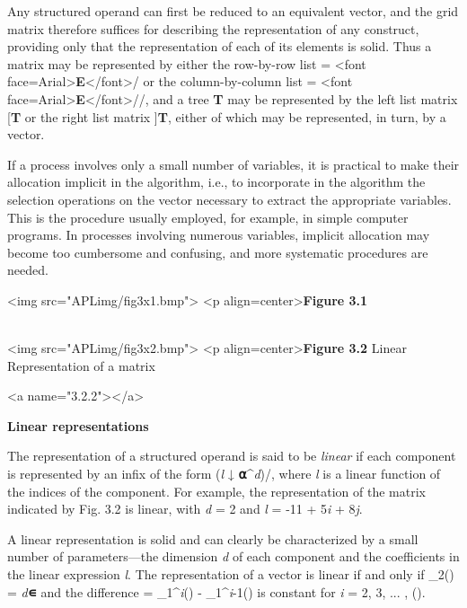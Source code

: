 {\par Any structured operand can first be reduced to an equivalent vector, and the grid matrix therefore suffices for describing the representation of any construct, providing only that the representation of each of its elements is solid. Thus a matrix  may be represented by either the row-by-row list
 = <font face=Arial>\textbf{E}</font>/ or the column-by-column list 
 = <font face=Arial>\textbf{E}</font>//, and a tree \textbf{T} may be represented by the left list matrix [\textbf{T} or the right list matrix ]\textbf{T}, either of which may be represented, in turn, by a vector.

\par If a process involves only a small number of variables, it is practical to make their allocation implicit in the algorithm, i.e., to incorporate in the algorithm the selection operations on the vector \textbf{\pi} necessary to extract the appropriate variables. This is the procedure usually employed, for example, in simple computer programs. In processes involving numerous variables, implicit allocation may become too cumbersome and confusing, and more systematic procedures are needed.

<img src="APLimg/fig3x1.bmp">
<p align=center>\textbf{Figure 3.1}
\\\ 

<img src="APLimg/fig3x2.bmp">
<p align=center>\textbf{Figure 3.2} Linear Representation of a matrix 



<a name="3.2.2"></a>
\par \textbf{Linear representations}

\par The representation of a structured operand is said to be \textit{linear} if each component is represented by an infix of the form 
(\textit{l} ↓ \textbf{⍺}^{\textit{d}})/\textbf{\pi}, where \textit{l} is a linear function of the indices of the component. For example, the representation of the matrix  indicated by Fig. 3.2 is linear, with \textit{d} = 2 and \textit{l} = -11 + 5\textit{i} + 8\textit{j}.

\par A linear representation is solid and can clearly be characterized by a small number of parameters---the dimension \textit{d} of each component and the coefficients in the linear expression \textit{l}. The representation of a vector  is linear if and only if \textbf{\Gamma}_{2}() = \textit{d}\textbf{∊} and the difference 
\textit{\delta} = \textbf{\Gamma}_{1}^{\textit{i}}() - \textbf{\Gamma}_{1}^{\textit{i}-1}() is constant for \textit{i} = 2, 3, ... , \textit{\nu}().

}
